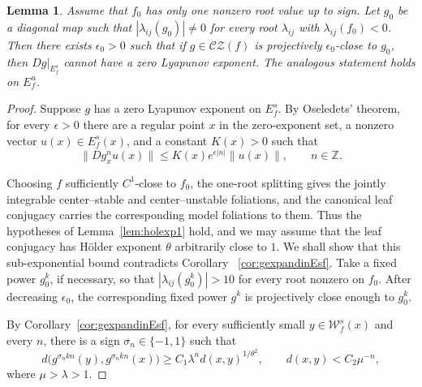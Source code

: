 \documentclass[11pt]{amsart}
\numberwithin{equation}{section}
\newcommand{\CZ}{\mathcal{CZ}}
\theoremstyle{plain}
\newtheorem{lem}[thm]{Lemma}
\begin{document}
\begin{lem}\label{gnozeroexp}
Assume that $f_0$ has only one nonzero root value up to sign.
 Let $g_0$ be a diagonal map such that
$|\lambda_{ij}(g_0)|\neq 0$ for every root $\lambda_{ij}$ with $\lambda_{ij}(f_0)<0$. Then there exists  $\epsilon_0>0$ such that if
$g\in\CZ(f)$ is projectively  $\epsilon_0$-close to $g_0$, then $Dg|_{E^s_f}$ cannot have a zero Lyapunov exponent. The analogous statement holds  on $E^u_f$. 
\end{lem}
\begin{proof}
Suppose $g$ has a zero Lyapunov exponent  on $E^s_f$. By  Oseledets'
theorem, for every $\epsilon>0$ there are a regular point $x$ in
the  zero-exponent set,  a nonzero vector $u(x)\in E^s_f(x)$, and a
constant  $K(x)>0$ such that
 \[
\|Dg^n_xu(x)\|\le K(x)e^{\epsilon|n|}\|u(x)\|,
\qquad n\in\mathbb Z.
\]

Choosing $f$ sufficiently $C^1$-close to
$f_0$, the one-root splitting gives the jointly integrable
center--stable and center--unstable foliations, and the canonical leaf
conjugacy carries the corresponding model foliations to them.  Thus the
hypotheses of Lemma~\ref{lem:holexp1} hold, and we may assume that
the leaf conjugacy has H\"older exponent
$\theta$ arbitrarily close to $1$. We shall show that this
sub-exponential bound contradicts Corollary ~\ref{cor:gexpandinEsf}.
 Take a fixed power  $g_0^k$, if necessary, so that
$|\lambda_{ij}(g_0^k)|>10$ for  every root  nonzero on $f_0$.  After
decreasing $\epsilon_0$, the  corresponding fixed power $g^k$ is
projectively  close enough to $g_0^k$.

 By Corollary~\ref{cor:gexpandinEsf}, for  every sufficiently  small
$y\in\mathcal W^s_f(x)$ and every $n$, there is a  sign
$\sigma_n\in\{-1,1\}$ such that
 \[
d\bigl(g^{\sigma_nkn}(y),g^{\sigma_nkn}(x)\bigr)
\ge C_1\lambda^n d(x,y)^{1/\theta^2},
\qquad d(x,y)<C_2\mu^{-n},
\]
where  $\mu>\lambda>1$.


\end{proof}
\end{document}
